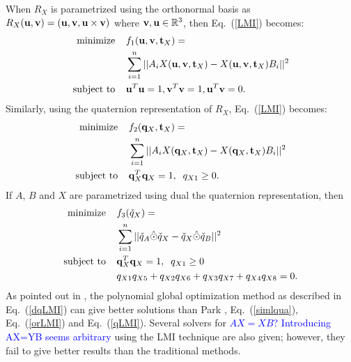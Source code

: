 \documentclass[twocolumn,10pt]{asme2ej}
\newcommand{\uu}{{\bf u}}
\newcommand{\vv}{{\bf v}}
\newcommand{\ttt}{{\bf t}}
\newcommand{\qq}{{\bf q}}
\begin{document}
When $R_X$ is parametrized using the orthonormal basis as $R_{X}(\uu, \vv) = ( \uu, \vv, \uu \times \vv)$ where $\vv, \uu \in \mathbb{R}^{3}$, then Eq.~(\ref{LMI}) becomes:
\begin{equation}
\begin{split}
\text{minimize} \; \; \; \;&f_{1}(\uu, \vv, \ttt_{X}) = \\
&\sum_{i=1}^n ||A_i X(\uu,\vv,\ttt_{X}) - X(\uu,\vv,\ttt_{X})B_i ||^2\\
\text{subject to} \; \; \; \; &\uu^{T}\uu = 1, \vv^{T}\vv = 1, \uu^{T}\vv = 0.
\end{split}
\label{orLMI}
\end{equation}
Similarly, using the quaternion representation of $R_{X}$, Eq.~(\ref{LMI}) becomes:
\begin{equation}
\begin{split}
\text{minimize} \; \; \; \; &f_{2}(\qq_{X}, \ttt_{X}) = \\
& \sum_{i=1}^{n}||A_iX(\qq_{X}, \ttt_{X}) - X(\qq_{X}, \ttt_{X})B_i||^{2}\\
\text{subject to} \; \; \; \; &\qq_{X}^{T}\qq_{X} = 1, \; \; q_{X1} \geq 0.
\end{split}
\label{qLMI}
\end{equation}
If $A$, $B$ and $X$ are parametrized using dual the quaternion representation, then
\begin{equation}
\begin{split}
\text{minimize} \; \; \; \; &f_{3}(\check{q}_{X}) = \\
 & \sum_{i=1}^{n}||\check{q}_{A} \hat{\odot} \check{q}_{X}- \check{q}_{X} \hat{\odot} \check{q}_{B}||^{2}\\
\text{subject to} \; \; \; \; &\qq_{X}^{T}\qq_{X} = 1, \; \; q_{X1} \geq 0 \\
&q_{X1}q_{X5} + q_{X2}q_{X6} + q_{X3}q_{X7} + q_{X4}q_{X8} = 0.
\end{split}
\label{dqLMI}
\end{equation} 
As pointed out in \cite{heller2014hand}, the polynomial global optimization method as described in Eq.~(\ref{dqLMI}) can give better solutions than Park \cite{park1994robot}, Eq.~(\ref{simlqua}), Eq.~(\ref{orLMI}) and Eq.~(\ref{qLMI}). Several solvers for \textcolor{blue}{$AX=XB$? Introducing AX=YB seems arbitrary} %
using the LMI technique are also given; however, they fail to give better results than the traditional methods.
\end{document}
